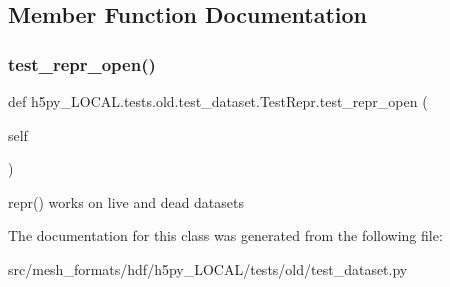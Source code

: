 \subsection{Member Function Documentation}
\mbox{\label{classh5py__LOCAL_1_1tests_1_1old_1_1test__dataset_1_1TestRepr_ad4b06a0bca67aa47b918e2e18d15cf98}} 
\subsubsection{\texorpdfstring{test\+\_\+repr\+\_\+open()}{test\_repr\_open()}}
{\footnotesize\ttfamily def h5py\+\_\+\+L\+O\+C\+A\+L.\+tests.\+old.\+test\+\_\+dataset.\+Test\+Repr.\+test\+\_\+repr\+\_\+open (\begin{DoxyParamCaption}\item[{}]{self }\end{DoxyParamCaption})}

\begin{DoxyVerb}repr() works on live and dead datasets \end{DoxyVerb}
 

The documentation for this class was generated from the following file\+:\begin{DoxyCompactItemize}
\item 
src/mesh\+\_\+formats/hdf/h5py\+\_\+\+L\+O\+C\+A\+L/tests/old/test\+\_\+dataset.\+py\end{DoxyCompactItemize}
